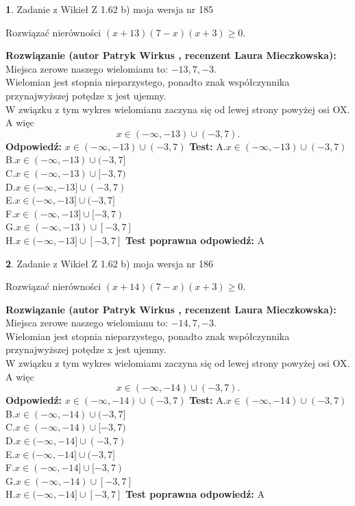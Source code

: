 \documentclass[12pt, a4paper]{article}
\theoremstyle{definition} %
\newtheorem{zad}{}
\newcommand{\zadStart}[1]{\begin{zad}#1\newline}
\newcommand{\zadStop}{\end{zad}}
\newcommand{\rozwStart}[2]{\noindent \textbf{Rozwiązanie (autor #1 , recenzent #2): }\newline}
\newcommand{\rozwStop}{\newline}
\newcommand{\odpStart}{\noindent \textbf{Odpowiedź:}\newline}
\newcommand{\odpStop}{\newline}
\newcommand{\testStart}{\noindent \textbf{Test:}\newline}
\newcommand{\testStop}{\newline}
\newcommand{\kluczStart}{\noindent \textbf{Test poprawna odpowiedź:}\newline}
\newcommand{\kluczStop}{\newline}
\begin{document}
\zadStart{Zadanie z Wikieł Z 1.62 b) moja wersja nr 185}

Rozwiązać nierówności $(x+13)(7-x)(x+3)\ge0$.
\zadStop
\rozwStart{Patryk Wirkus}{Laura Mieczkowska}
Miejsca zerowe naszego wielomianu to: $-13, 7, -3$.\\
Wielomian jest stopnia nieparzystego, ponadto znak współczynnika przy\linebreak najwyższej potędze x jest ujemny.\\ W związku z tym wykres wielomianu zaczyna się od lewej strony powyżej osi OX. A więc $$x \in (-\infty,-13) \cup (-3,7).$$
\rozwStop
\odpStart
$x \in (-\infty,-13) \cup (-3,7)$
\odpStop
\testStart
A.$x \in (-\infty,-13) \cup (-3,7)$\\
B.$x \in (-\infty,-13) \cup (-3,7]$\\
C.$x \in (-\infty,-13) \cup [-3,7)$\\
D.$x \in (-\infty,-13] \cup (-3,7)$\\
E.$x \in (-\infty,-13] \cup (-3,7]$\\
F.$x \in (-\infty,-13] \cup [-3,7)$\\
G.$x \in (-\infty,-13) \cup [-3,7]$\\
H.$x \in (-\infty,-13] \cup [-3,7]$
\testStop
\kluczStart
A
\kluczStop



\zadStart{Zadanie z Wikieł Z 1.62 b) moja wersja nr 186}

Rozwiązać nierówności $(x+14)(7-x)(x+3)\ge0$.
\zadStop
\rozwStart{Patryk Wirkus}{Laura Mieczkowska}
Miejsca zerowe naszego wielomianu to: $-14, 7, -3$.\\
Wielomian jest stopnia nieparzystego, ponadto znak współczynnika przy\linebreak najwyższej potędze x jest ujemny.\\ W związku z tym wykres wielomianu zaczyna się od lewej strony powyżej osi OX. A więc $$x \in (-\infty,-14) \cup (-3,7).$$
\rozwStop
\odpStart
$x \in (-\infty,-14) \cup (-3,7)$
\odpStop
\testStart
A.$x \in (-\infty,-14) \cup (-3,7)$\\
B.$x \in (-\infty,-14) \cup (-3,7]$\\
C.$x \in (-\infty,-14) \cup [-3,7)$\\
D.$x \in (-\infty,-14] \cup (-3,7)$\\
E.$x \in (-\infty,-14] \cup (-3,7]$\\
F.$x \in (-\infty,-14] \cup [-3,7)$\\
G.$x \in (-\infty,-14) \cup [-3,7]$\\
H.$x \in (-\infty,-14] \cup [-3,7]$
\testStop
\kluczStart
A
\kluczStop
\end{document}
